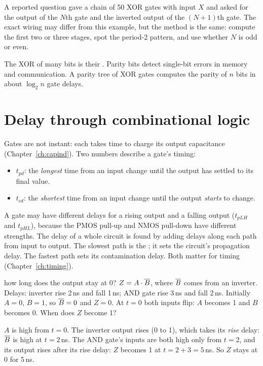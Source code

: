 \begin{onoa}
A reported question gave a chain of 50 XOR gates with input $X$ and asked for the output of the $N$th gate and the inverted output of the $(N+1)$th gate. The exact wiring may differ from this example, but the method is the same: compute the first two or three stages, spot the period-2 pattern, and use whether $N$ is odd or even.
\end{onoa}

The XOR of many bits is their . Parity bits detect single-bit errors in memory and communication. A parity tree of XOR gates computes the parity of $n$ bits in about $\log_2 n$ gate delays.

\section{Delay through combinational logic}
\label{sec:combdelay}

Gates are not instant: each takes time to charge its output capacitance (Chapter~\ref{ch:capind}). Two numbers describe a gate's timing:

\begin{itemize}
  \item {} $t_{pd}$: the \emph{longest} time from an input change until the output has settled to its final value.
  \item {} $t_{cd}$: the \emph{shortest} time from an input change until the output \emph{starts} to change.
\end{itemize}

A gate may have different delays for a rising output and a falling output ($t_{pLH}$ and $t_{pHL}$), because the PMOS pull-up and NMOS pull-down have different strengths. The delay of a whole circuit is found by adding delays along each path from input to output. The slowest path is the ; it sets the circuit's propagation delay. The fastest path sets its contamination delay. Both matter for timing (Chapter~\ref{ch:timing}).

\begin{worked}{how long does the output stay at 0?}
$Z = A \cdot \overline{B}$, where $\overline{B}$ comes from an inverter. Delays: inverter rise 2\,ns and fall 1\,ns; AND gate rise 3\,ns and fall 2\,ns. Initially $A = 0$, $B = 1$, so $\overline{B} = 0$ and $Z = 0$. At $t = 0$ both inputs flip: $A$ becomes 1 and $B$ becomes 0. When does $Z$ become 1?

$A$ is high from $t = 0$. The inverter output rises (0 to 1), which takes its \emph{rise} delay: $\overline{B}$ is high at $t = 2$\,ns. The AND gate's inputs are both high only from $t = 2$, and its output rises after its rise delay: $Z$ becomes 1 at $t = 2 + 3 = 5$\,ns. So $Z$ stays at 0 for 5\,ns.
\end{worked}

